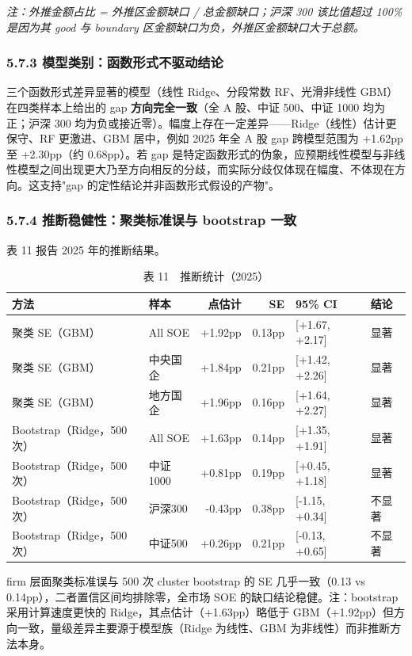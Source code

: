\documentclass[11pt,a4paper]{ctexart}
\begin{document}
\emph{注：外推金额占比 = 外推区金额缺口 / 总金额缺口；沪深 300 该比值超过 100\% 是因为其 good 与 boundary 区金额缺口为负，外推区金额缺口大于总额。}

\subsubsection{5.7.3 模型类别：函数形式不驱动结论}

三个函数形式差异显著的模型（线性 Ridge、分段常数 RF、光滑非线性 GBM）在四类样本上给出的 gap \textbf{方向完全一致}（全 A 股、中证 500、中证 1000 均为正；沪深 300 均为负或接近零）。幅度上存在一定差异------Ridge（线性）估计更保守、RF 更激进、GBM 居中，例如 2025 年全 A 股 gap 跨模型范围为 +1.62pp 至 +2.30pp（约 0.68pp）。若 gap 是特定函数形式的伪象，应预期线性模型与非线性模型之间出现更大乃至方向相反的分歧，而实际分歧仅体现在幅度、不体现在方向。这支持"gap 的定性结论并非函数形式假设的产物"。

\subsubsection{5.7.4 推断稳健性：聚类标准误与 bootstrap 一致}

表 11 报告 2025 年的推断结果。

\begin{table}[H]
\centering
\footnotesize
\caption{表 11　推断统计（2025）}
\begin{tabular}{llrrll}
\toprule
方法 & 样本 & 点估计 & SE & 95\% CI & 结论 \\
\midrule
聚类 SE（GBM） & All SOE & +1.92pp & 0.13pp & [+1.67, +2.17] & 显著 \\
聚类 SE（GBM） & 中央国企 & +1.84pp & 0.21pp & [+1.42, +2.26] & 显著 \\
聚类 SE（GBM） & 地方国企 & +1.96pp & 0.16pp & [+1.64, +2.27] & 显著 \\
Bootstrap（Ridge，500 次） & All SOE & +1.63pp & 0.14pp & [+1.35, +1.91] & 显著 \\
Bootstrap（Ridge，500 次） & 中证1000 & +0.81pp & 0.19pp & [+0.45, +1.18] & 显著 \\
Bootstrap（Ridge，500 次） & 沪深300 & -0.43pp & 0.38pp & [-1.15, +0.34] & 不显著 \\
Bootstrap（Ridge，500 次） & 中证500 & +0.26pp & 0.21pp & [-0.13, +0.65] & 不显著 \\
\bottomrule
\end{tabular}
\end{table}

firm 层面聚类标准误与 500 次 cluster bootstrap 的 SE 几乎一致（0.13 vs 0.14pp），二者置信区间均排除零，全市场 SOE 的缺口结论稳健。注：bootstrap 采用计算速度更快的 Ridge，其点估计（+1.63pp）略低于 GBM（+1.92pp）但方向一致，量级差异主要源于模型族（Ridge 为线性、GBM 为非线性）而非推断方法本身。
\end{document}
